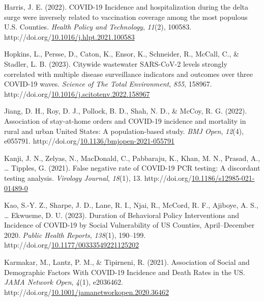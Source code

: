 \documentclass[12pt,twoside]{smiththesis}
\newlength{\cslhangindent}
\newenvironment{CSLReferences}[2] %
 {%
\setlength{\parindent}{0pt}
\ifodd #1 \everypar{\setlength{\hangindent}{\cslhangindent}}\ignorespaces\fi
\ifnum #2 > 0
\setlength{\parskip}{#2\baselineskip}
  \fi
}%
{}
\begin{document}
\begin{CSLReferences}{1}{0}
\leavevmode{}%
Harris, J. E. (2022). {COVID-19 Incidence} and hospitalization during the delta surge were inversely related to vaccination coverage among the most populous {U}.{S}. {Counties}. \emph{Health Policy and Technology}, \emph{11}(2), 100583. http://doi.org/\href{https://doi.org/10.1016/j.hlpt.2021.100583}{10.1016/j.hlpt.2021.100583}

\leavevmode{}%
Hopkins, L., Persse, D., Caton, K., Ensor, K., Schneider, R., McCall, C., \& Stadler, L. B. (2023). Citywide wastewater {SARS-CoV-2} levels strongly correlated with multiple disease surveillance indicators and outcomes over three {COVID-19} waves. \emph{Science of The Total Environment}, \emph{855}, 158967. http://doi.org/\href{https://doi.org/10.1016/j.scitotenv.2022.158967}{10.1016/j.scitotenv.2022.158967}

\leavevmode{}%
Jiang, D. H., Roy, D. J., Pollock, B. D., Shah, N. D., \& McCoy, R. G. (2022). Association of stay-at-home orders and {COVID-19} incidence and mortality in rural and urban {United States}: A population-based study. \emph{BMJ Open}, \emph{12}(4), e055791. http://doi.org/\href{https://doi.org/10.1136/bmjopen-2021-055791}{10.1136/bmjopen-2021-055791}

\leavevmode{}%
Kanji, J. N., Zelyas, N., MacDonald, C., Pabbaraju, K., Khan, M. N., Prasad, A., \ldots{} Tipples, G. (2021). False negative rate of {COVID-19 PCR} testing: A discordant testing analysis. \emph{Virology Journal}, \emph{18}(1), 13. http://doi.org/\href{https://doi.org/10.1186/s12985-021-01489-0}{10.1186/s12985-021-01489-0}

\leavevmode{}%
Kao, S.-Y. Z., Sharpe, J. D., Lane, R. I., Njai, R., McCord, R. F., Ajiboye, A. S., \ldots{} Ekwueme, D. U. (2023). Duration of {Behavioral Policy Interventions} and {Incidence} of {COVID-19} by {Social Vulnerability} of {US Counties}, {April}--{December} 2020. \emph{Public Health Reports}, \emph{138}(1), 190--199. http://doi.org/\href{https://doi.org/10.1177/00333549221125202}{10.1177/00333549221125202}

\leavevmode{}%
Karmakar, M., Lantz, P. M., \& Tipirneni, R. (2021). Association of {Social} and {Demographic Factors With COVID-19 Incidence} and {Death Rates} in the {US}. \emph{JAMA Network Open}, \emph{4}(1), e2036462. http://doi.org/\href{https://doi.org/10.1001/jamanetworkopen.2020.36462}{10.1001/jamanetworkopen.2020.36462}


\end{CSLReferences}
\end{document}
